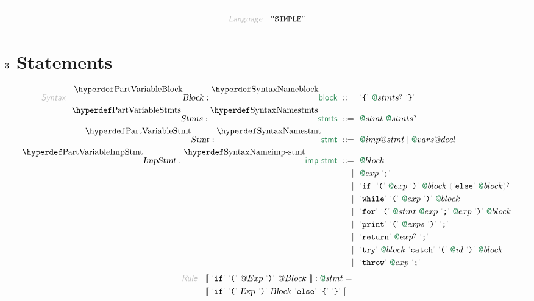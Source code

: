 

\begin{center}
\rule{3in}{0.4pt}
\end{center}

\begin{displaymath}
\KEY{Language} \quad \LANG{\STRING{SIMPLE}}
\end{displaymath}

\section{$\SECT{3}$ Statements}\hypertarget{SectionNumber:3}{}\label{SectionNumber:3}

\begin{align*}
  \KEY{Syntax} \quad
    \VARDEC{Block} : \SYNDEC{block}
      \ ::= \ & \
      \LEX{{\LEFTBRACE}} \ \SYN@stmts\QUERY \ \LEX{{\RIGHTBRACE}}
    \\
    \VARDEC{Stmts} : \SYNDEC{stmts}
      \ ::= \ & \
      \SYN@stmt \ \SYN@stmts\QUERY
    \\
    \VARDEC{Stmt} : \SYNDEC{stmt}
      \ ::= \ & \
      \SYN@imp@stmt \mid \SYN@vars@decl
    \\
    \VARDEC{ImpStmt} : \SYNDEC{imp-stmt}
      \ ::= \ & \
      \SYN@block \\
      \ \mid \ & \ \SYN@exp \ \LEX{{;}} \\
      \ \mid \ & \ \LEX{if} \ \LEX{{(}} \ \SYN@exp \ \LEX{{)}} \ \SYN@block \ \LEFTGROUP \LEX{else} \ \SYN@block \RIGHTGROUP\QUERY \\
      \ \mid \ & \ \LEX{while} \ \LEX{{(}} \ \SYN@exp \ \LEX{{)}} \ \SYN@block \\
      \ \mid \ & \ \LEX{for} \ \LEX{{(}} \ \SYN@stmt \ \SYN@exp \ \LEX{{;}} \ \SYN@exp \ \LEX{{)}} \ \SYN@block \\
      \ \mid \ & \ \LEX{print} \ \LEX{{(}} \ \SYN@exps \ \LEX{{)}} \ \LEX{{;}} \\
      \ \mid \ & \ \LEX{return} \ \SYN@exp\QUERY \ \LEX{{;}} \\
      \ \mid \ & \ \LEX{try} \ \SYN@block \ \LEX{catch} \ \LEX{{(}} \ \SYN@id \ \LEX{{)}} \ \SYN@block \\
      \ \mid \ & \ \LEX{throw} \ \SYN@exp \ \LEX{{;}}
\end{align*}
\begin{align*}
  \KEY{Rule} \quad
    & \LEFTPHRASE \
        \LEX{if} \ \LEX{{(}} \ \VAR@Exp \ \LEX{{)}} \ \VAR@Block \
      \RIGHTPHRASE : \SYN@stmt = \\&
      \LEFTPHRASE \
        \LEX{if} \ \LEX{{(}} \ \VAR{Exp} \ \LEX{{)}} \ \VAR{Block} \ \LEX{else} \ \LEX{{\LEFTBRACE}} \ \LEX{{\RIGHTBRACE}} \
      \RIGHTPHRASE
\end{align*}
